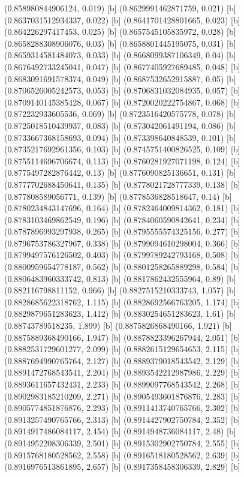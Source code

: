 {{{(0.858980844906124, 0.019) [b] 
(0.8629991462871759, 0.021) [b] 
(0.8637031512934337, 0.022) [b] 
(0.8641701428801665, 0.023) [b] 
(0.864226297417453, 0.025) [b] 
(0.8657545105835972, 0.028) [b] 
(0.8658288308906076, 0.03) [b] 
(0.8658801445195075, 0.031) [b] 
(0.8659314581484073, 0.033) [b] 
(0.8668099387106349, 0.04) [b] 
(0.8676492733245041, 0.047) [b] 
(0.8677405927689485, 0.048) [b] 
(0.8683091691578374, 0.049) [b] 
(0.8687532652915887, 0.05) [b] 
(0.8706526005242573, 0.053) [b] 
(0.8706831032084935, 0.057) [b] 
(0.8709140145385428, 0.067) [b] 
(0.8720020222754867, 0.068) [b] 
(0.872232933605536, 0.069) [b] 
(0.8723516420575778, 0.078) [b] 
(0.8725018510439937, 0.083) [b] 
(0.873042061491194, 0.086) [b] 
(0.8733667368158693, 0.094) [b] 
(0.873398640848539, 0.101) [b] 
(0.8735217692961356, 0.103) [b] 
(0.8745751400826525, 0.109) [b] 
(0.8755114696706674, 0.113) [b] 
(0.8760281927071198, 0.124) [b] 
(0.8775497282876442, 0.13) [b] 
(0.8776090825136651, 0.131) [b] 
(0.8777702688450641, 0.135) [b] 
(0.8778021728777339, 0.138) [b] 
(0.877808589056771, 0.139) [b] 
(0.8778536828518647, 0.14) [b] 
(0.8780234843147696, 0.164) [b] 
(0.8782464009814362, 0.181) [b] 
(0.8783103469862549, 0.196) [b] 
(0.8784060590842641, 0.234) [b] 
(0.8787896993297938, 0.265) [b] 
(0.8795555574325156, 0.277) [b] 
(0.8796753786327967, 0.338) [b] 
(0.8799094610298004, 0.366) [b] 
(0.8799497576126502, 0.403) [b] 
(0.8799789242793168, 0.508) [b] 
(0.8800959654778187, 0.562) [b] 
(0.8801258265889298, 0.584) [b] 
(0.8806483960333742, 0.813) [b] 
(0.8817862432555964, 0.89) [b] 
(0.882116798811152, 0.966) [b] 
(0.8827515210333743, 1.057) [b] 
(0.8828685622318762, 1.115) [b] 
(0.8828692566763205, 1.174) [b] 
(0.8829879651283623, 1.412) [b] 
(0.8830254651283623, 1.61) [b] 
(0.88743789518235, 1.899) [b] 
(0.8875826868490166, 1.921) [b] 
(0.8875889368490166, 1.947) [b] 
(0.8878823396267944, 2.051) [b] 
(0.8882531729601277, 2.099) [b] 
(0.8882615129654653, 2.115) [b] 
(0.8887694990765764, 2.127) [b] 
(0.8889379018543542, 2.129) [b] 
(0.8891472768543541, 2.204) [b] 
(0.8893542212987986, 2.229) [b] 
(0.8893611657432431, 2.233) [b] 
(0.8899097768543542, 2.268) [b] 
(0.8902983185210209, 2.271) [b] 
(0.8905493601876876, 2.283) [b] 
(0.8905774851876876, 2.293) [b] 
(0.8911413740765766, 2.302) [b] 
(0.8913257490765766, 2.313) [b] 
(0.8914427902750784, 2.352) [b] 
(0.8914917486084117, 2.454) [b] 
(0.8914948736084117, 2.48) [b] 
(0.8914952208306339, 2.501) [b] 
(0.8915302902750784, 2.555) [b] 
(0.8915768180528562, 2.558) [b] 
(0.8916518180528562, 2.639) [b] 
(0.8916976513861895, 2.657) [b] 
(0.8917358458306339, 2.829) [b] 
}}}
